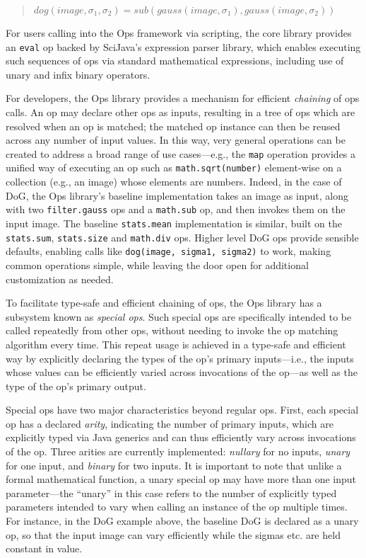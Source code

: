 \documentclass{bmcart}
\begin{document}
\begin{quote}
  $dog(image, \sigma_1, \sigma_2) =
  sub(gauss(image, \sigma_1), gauss(image, \sigma_2))$
\end{quote}

For users calling into the Ops framework via scripting, the core library
provides an \texttt{eval} op backed by SciJava's expression parser library,
which enables executing such sequences of ops via standard mathematical
expressions, including use of unary and infix binary operators.

For developers, the Ops library provides a mechanism for efficient
\textit{chaining} of ops calls. An op may declare other ops as inputs,
resulting in a tree of ops which are resolved when an op is matched; the
matched op instance can then be reused across any number of input values. In
this way, very general operations can be created to address a broad range of
use cases---e.g., the \texttt{map} operation provides a unified way of
executing an op such as \texttt{math.sqrt(number)} element-wise on a collection
(e.g., an image) whose elements are numbers. Indeed, in the case of DoG, the
Ops library's baseline implementation takes an image as input, along with two
\texttt{filter.gauss} ops and a \texttt{math.sub} op, and then invokes them on
the input image. The baseline \texttt{stats.mean} implementation is similar,
built on the \texttt{stats.sum}, \texttt{stats.size} and \texttt{math.div} ops.
Higher level DoG ops provide sensible defaults, enabling calls like
\texttt{dog(image, sigma1, sigma2)} to work, making common operations simple,
while leaving the door open for additional customization as needed.

To facilitate type-safe and efficient chaining of ops, the Ops library has a
subsystem known as \textit{special ops}. Such special ops are specifically
intended to be called repeatedly from other ops, without needing to invoke the
op matching algorithm every time. This repeat usage is achieved in a type-safe
and efficient way by explicitly declaring the types of the op's primary
inputs---i.e., the inputs whose values can be efficiently varied across
invocations of the op---as well as the type of the op's primary output.

Special ops have two major characteristics beyond regular ops. First, each
special op has a declared \textit{arity}, indicating the number of primary
inputs, which are explicitly typed via Java generics and can thus efficiently
vary across invocations of the op. Three arities are currently implemented:
\textit{nullary} for no inputs, \textit{unary} for one input, and
\textit{binary} for two inputs. It is important to note that unlike a formal
mathematical function, a unary special op may have more than one input
parameter---the ``unary'' in this case refers to the number of explicitly typed
parameters intended to vary when calling an instance of the op multiple times.
For instance, in the DoG example above, the baseline DoG is declared as a unary
op, so that the input image can vary efficiently while the sigmas etc. are held
constant in value.
\end{document}
